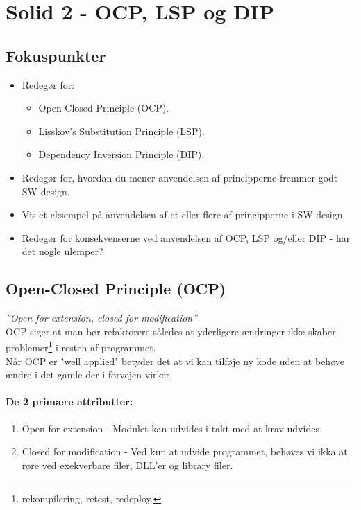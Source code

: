 \section{Solid 2 - OCP, LSP og DIP}

\subsection{Fokuspunkter}

\begin{itemize}
	\item Redegør for:
	\begin{itemize}
		\item Open-Closed Principle (OCP).
		\item Lisskov's Substitution Principle (LSP).
		\item Dependency Inversion Principle (DIP).
	\end{itemize}
	\item Redegør for, hvordan du mener anvendelsen af principperne fremmer godt SW design.
	\item Vis et eksempel på anvendelsen af et eller flere af principperne i SW design.
	\item Redegør for konsekvenserne ved anvendelsen af OCP, LSP og/eller DIP - har det nogle ulemper?
\end{itemize}

\subsection{Open-Closed Principle (OCP)}
\textit{''Open for extension, closed for modification''}\\

OCP siger at man bør refaktorere således at yderligere ændringer ikke skaber problemer\footnote{rekompilering, retest, redeploy.} i resten af programmet.\\

Når OCP er "well applied" betyder det at vi kan tilføje ny kode uden at behøve ændre i det gamle der i forvejen virker.

\paragraph{De 2 primære attributter:}
\begin{enumerate}
	\item Open for extension - Modulet kan udvides i takt med at krav udvides.
	\item Closed for modification - Ved kun at udvide programmet, behøves vi ikka at røre ved exekverbare filer, DLL'er og library filer.
\end{enumerate}

